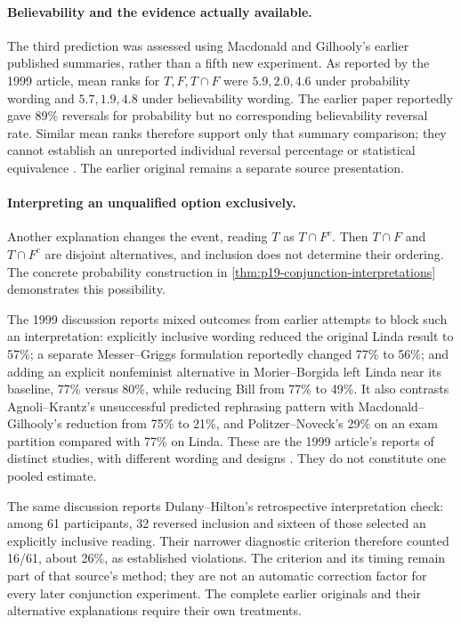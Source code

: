 \paragraph{Believability and the evidence actually available.}
The third prediction was assessed using Macdonald and Gilhooly's
earlier published summaries, rather than a fifth new experiment.
As reported by the 1999 article, mean ranks for \(T,F,T\cap F\)
were \(5.9,2.0,4.6\) under probability wording and
\(5.7,1.9,4.8\) under believability wording.
The earlier paper reportedly gave 89\% reversals for probability
but no corresponding believability reversal rate.
Similar mean ranks therefore support only that summary comparison;
they cannot establish an unreported individual reversal percentage
or statistical equivalence
\cite[p.~292]{HertwigGigerenzer1999Conjunction}.
The earlier original remains a separate source presentation.

\paragraph{Interpreting an unqualified option exclusively.}
Another explanation changes the event, reading \(T\) as
\(T\cap F^c\). Then \(T\cap F\) and \(T\cap F^c\)
are disjoint alternatives, and inclusion does not determine
their ordering. The concrete probability construction in
\cref{thm:p19-conjunction-interpretations} demonstrates this
possibility.

The 1999 discussion reports mixed outcomes from earlier attempts
to block such an interpretation: explicitly inclusive wording
reduced the original Linda result to 57\%; a separate
Messer--Griggs formulation reportedly changed 77\% to 56\%;
and adding an explicit nonfeminist alternative in
Morier--Borgida left Linda near its baseline, 77\% versus 80\%,
while reducing Bill from 77\% to 49\%.
It also contrasts Agnoli--Krantz's unsuccessful predicted
rephrasing pattern with Macdonald--Gilhooly's reduction from
75\% to 21\%, and Politzer--Noveck's 29\% on an exam
partition compared with 77\% on Linda.
These are the 1999 article's reports of distinct studies,
with different wording and designs
\cite[pp.~297--298]{HertwigGigerenzer1999Conjunction}.
They do not constitute one pooled estimate.

The same discussion reports Dulany--Hilton's retrospective
interpretation check: among 61 participants, 32 reversed
inclusion and sixteen of those selected an explicitly inclusive
reading. Their narrower diagnostic criterion therefore counted
16/61, about 26\%, as established violations.
The criterion and its timing remain part of that source's
method; they are not an automatic correction factor for
every later conjunction experiment. The complete earlier
originals and their alternative explanations require their
own treatments.

